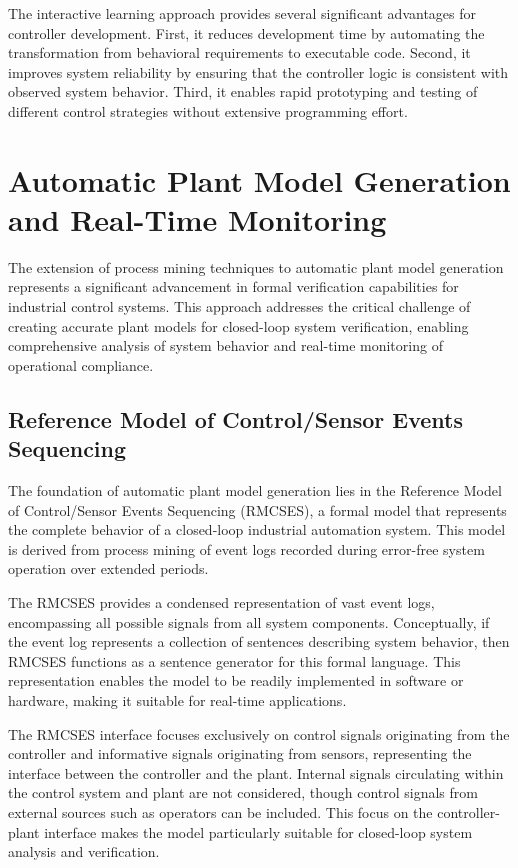 The interactive learning approach provides several significant advantages for controller development. First, it reduces development time by automating the transformation from behavioral requirements to executable code. Second, it improves system reliability by ensuring that the controller logic is consistent with observed system behavior. Third, it enables rapid prototyping and testing of different control strategies without extensive programming effort.

\section{Automatic Plant Model Generation and Real-Time Monitoring}

The extension of process mining techniques to automatic plant model generation represents a significant advancement in formal verification capabilities for industrial control systems. This approach addresses the critical challenge of creating accurate plant models for closed-loop system verification, enabling comprehensive analysis of system behavior and real-time monitoring of operational compliance.

\subsection{Reference Model of Control/Sensor Events Sequencing}

The foundation of automatic plant model generation lies in the Reference Model of Control/Sensor Events Sequencing (RMCSES), a formal model that represents the complete behavior of a closed-loop industrial automation system. This model is derived from process mining of event logs recorded during error-free system operation over extended periods.

The RMCSES provides a condensed representation of vast event logs, encompassing all possible signals from all system components. Conceptually, if the event log represents a collection of sentences describing system behavior, then RMCSES functions as a sentence generator for this formal language. This representation enables the model to be readily implemented in software or hardware, making it suitable for real-time applications.



The RMCSES interface focuses exclusively on control signals originating from the controller and informative signals originating from sensors, representing the interface between the controller and the plant. Internal signals circulating within the control system and plant are not considered, though control signals from external sources such as operators can be included. This focus on the controller-plant interface makes the model particularly suitable for closed-loop system analysis and verification.

